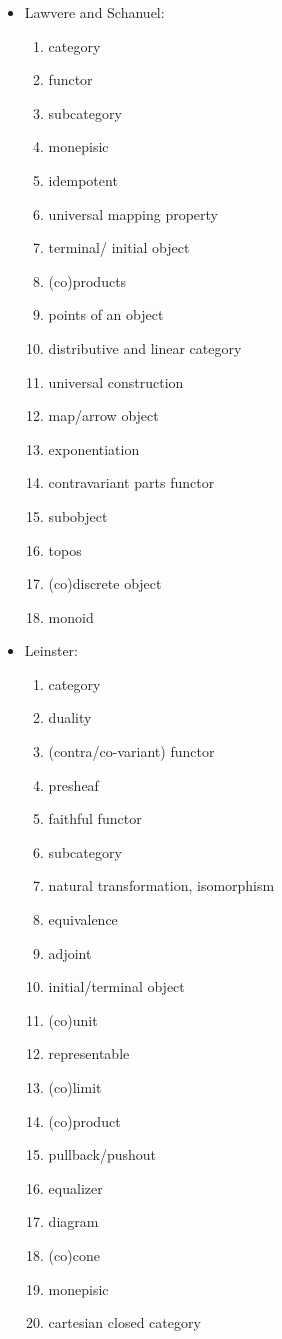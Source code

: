 \documentclass[11pt,openany]{book}
\begin{document}
\begin{itemize}
\item Lawvere and Schanuel:~\cite{lawvere_schanuel_2009_conceptual_math}
\begin{enumerate}
  \item category
  \item functor
  \item subcategory
  \item monepisic
  \item idempotent
  \item universal mapping property
  \item terminal/ initial object
  \item (co)products
  \item points of an object
  \item distributive and linear category
  \item universal construction
  \item map/arrow object
  \item exponentiation
  \item contravariant parts functor
  \item subobject
  \item topos
  \item (co)discrete object
  \item monoid
  
\end{enumerate}

\item Leinster:~\cite{leinster_2016_basic_category_theory}
\begin{enumerate}
  \item category
  \item duality
  \item (contra/co-variant) functor
  \item presheaf
  \item faithful functor
  \item subcategory
  \item natural transformation, isomorphism
  \item equivalence
  \item adjoint
  \item initial/terminal object
  \item (co)unit
  \item representable
  \item (co)limit
  \item (co)product
  \item pullback/pushout
  \item equalizer
  \item diagram
  \item (co)cone
  \item monepisic
  \item cartesian closed category
\end{enumerate}


\end{itemize}
\end{document}
